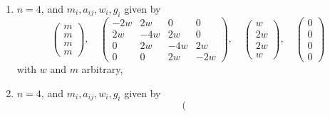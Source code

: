 \begin{lemma}
\begin{enumerate}
$$
\left(
\begin{matrix}
2m \\
2m \\
2m \\
m
\end{matrix}
\right),
\quad
\left(
\begin{matrix}
-2w & 2w & 0 & 0 \\
2w & -4w & 2w & 0 \\
0 & 2w & -4w & 4w \\
0 & 0 & 4w & -8w
\end{matrix}
\right),
\quad
\left(
\begin{matrix}
w \\
2w \\
2w \\
4w
\end{matrix}
\right),
\quad
\left(
\begin{matrix}
0 \\
0 \\
0 \\
0
\end{matrix}
\right)
$$
with $w$ and $m$ arbitrary,
\item
\label{models-item-up-equal-down}
$n = 4$, and $m_i, a_{ij}, w_i, g_i$ given by
$$
\left(
\begin{matrix}
m \\
m \\
m \\
m
\end{matrix}
\right),
\quad
\left(
\begin{matrix}
-2w & 2w & 0 & 0 \\
2w & -4w & 2w & 0 \\
0 & 2w & -4w & 2w \\
0 & 0 & 2w & -2w
\end{matrix}
\right),
\quad
\left(
\begin{matrix}
w \\
2w \\
2w \\
w
\end{matrix}
\right),
\quad
\left(
\begin{matrix}
0 \\
0 \\
0 \\
0
\end{matrix}
\right)
$$
with $w$ and $m$ arbitrary,
\item
\label{models-item-down-equal-up}
$n = 4$, and $m_i, a_{ij}, w_i, g_i$ given by
$$
\left(
\begin{matrix}

\end{matrix}$$
\end{enumerate}
\end{lemma}
